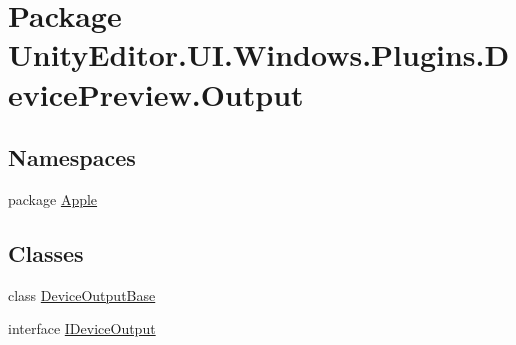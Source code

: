 \hypertarget{namespace_unity_editor_1_1_u_i_1_1_windows_1_1_plugins_1_1_device_preview_1_1_output}{}\section{Package Unity\+Editor.\+U\+I.\+Windows.\+Plugins.\+Device\+Preview.\+Output}
\label{namespace_unity_editor_1_1_u_i_1_1_windows_1_1_plugins_1_1_device_preview_1_1_output}
\subsection*{Namespaces}
\begin{DoxyCompactItemize}
\item 
package \hyperlink{namespace_unity_editor_1_1_u_i_1_1_windows_1_1_plugins_1_1_device_preview_1_1_output_1_1_apple}{Apple}
\end{DoxyCompactItemize}
\subsection*{Classes}
\begin{DoxyCompactItemize}
\item 
class \hyperlink{class_unity_editor_1_1_u_i_1_1_windows_1_1_plugins_1_1_device_preview_1_1_output_1_1_device_output_base}{Device\+Output\+Base}
\item 
interface \hyperlink{interface_unity_editor_1_1_u_i_1_1_windows_1_1_plugins_1_1_device_preview_1_1_output_1_1_i_device_output}{I\+Device\+Output}
\end{DoxyCompactItemize}
